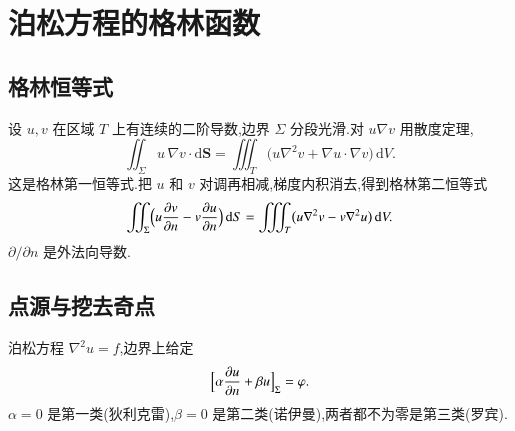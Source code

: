 \section{泊松方程的格林函数}

\subsection{格林恒等式}
设 $u,v$ 在区域 $T$ 上有连续的二阶导数,边界 $\Sigma$ 分段光滑.对 $u\nabla v$ 用散度定理,
\begin{equation}
  \iint_{\Sigma} u\,\nabla v\cdot\mathrm{d}\mathbf{S}
  =\iiint_{T}\bigl(u\nabla^2 v+\nabla u\cdot\nabla v\bigr)\,\mathrm{d}V.
\end{equation}
这是格林第一恒等式.把 $u$ 和 $v$ 对调再相减,梯度内积消去,得到格林第二恒等式
\begin{equation}
  \iint_{\Sigma}\Bigl(
    u\frac{\partial v}{\partial n}-v\frac{\partial u}{\partial n}
  \Bigr)\,\mathrm{d}S
  =\iiint_{T}\bigl(u\nabla^2 v-v\nabla^2 u\bigr)\,\mathrm{d}V.
  \label{eq:green2}
\end{equation}
$\partial/\partial n$ 是外法向导数.

\subsection{点源与挖去奇点}
泊松方程 $\nabla^2 u=f$,边界上给定
\begin{equation}
  \Bigl[\alpha\frac{\partial u}{\partial n}+\beta u\Bigr]_{\Sigma}=\varphi.
  \label{eq:gf-bc}
\end{equation}
$\alpha=0$ 是第一类(狄利克雷),$\beta=0$ 是第二类(诺伊曼),两者都不为零是第三类(罗宾).

